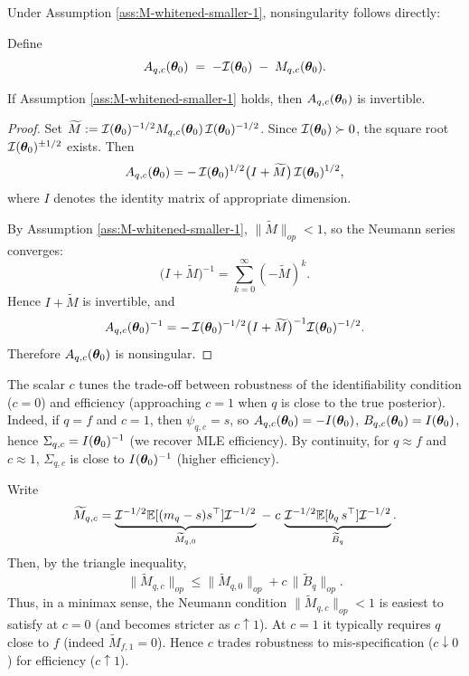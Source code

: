 \documentclass[twoside,11pt]{article}
\begin{document}
Under Assumption \eqref{ass:M-whitened-smaller-1}, nonsingularity follows directly:

\begin{lemma}
Define
\[
A_{q,c}({\bm{\theta}}_0)\;=\;-\mathcal I({{\bm{\theta}}_0}) \;-\; M_{q,c}({\bm{\theta}}_0).
\]

If Assumption \eqref{ass:M-whitened-smaller-1} holds, then $A_{q,c}({\bm{\theta}}_0)$ is invertible.
\end{lemma}

\begin{proof}
Set $\widetilde M := \mathcal I({{\bm{\theta}}_0})^{-1/2} M_{q,c}({\bm{\theta}}_0)\,\mathcal I({{\bm{\theta}}_0})^{-1/2}$. 
Since $\mathcal I({{\bm{\theta}}_0})\succ0$, the square root $\mathcal I({{\bm{\theta}}_0})^{\pm 1/2}$ exists. 
Then
\[
A_{q,c}({\bm{\theta}}_0)
= -\,\mathcal I({{\bm{\theta}}_0})^{1/2}\bigl(I+\widetilde M\bigr)\,\mathcal I({{\bm{\theta}}_0})^{1/2},
\]
where $I$ denotes the identity matrix of appropriate dimension.

By Assumption \eqref{ass:M-whitened-smaller-1}, $\|\widetilde M\|_{op}<1$, 
so the Neumann series converges:
\[
\bigl(I+\widetilde M\bigr)^{-1}=\sum_{k=0}^{\infty}(-\widetilde M)^k.
\]
Hence $I+\widetilde M$ is invertible, and
\[
A_{q,c}({\bm{\theta}}_0)^{-1}
= -\,\mathcal I({{\bm{\theta}}_0})^{-1/2}\bigl(I+\widetilde M\bigr)^{-1}\mathcal I({{\bm{\theta}}_0})^{-1/2}.
\]
Therefore $A_{q,c}({\bm{\theta}}_0)$ is nonsingular.
\end{proof}


\begin{corollary} The scalar $c$ tunes the trade-off between robustness of the identifiability condition ($c=0$) and efficiency (approaching $c=1$ when $q$ is close to the true posterior). 
Indeed, if $q=f$ and $c=1$, then $\psi_{q,c}=s$, so
$A_{q,c}({\bm{\theta}}_0)=-I({\bm{\theta}}_0)$, $B_{q,c}({\bm{\theta}}_0)=I({\bm{\theta}}_0)$, hence
$\Sigma_{q,c}=I({\bm{\theta}}_0)^{-1}$ (we recover MLE efficiency). By continuity, for $q\approx f$ and $c\approx1$,
$\Sigma_{q,c}$ is close to $I({\bm{\theta}}_0)^{-1}$ (higher efficiency).

\medskip
Write
\[
\widetilde M_{q,c}=\underbrace{\mathcal I^{-1/2}\mathbb{E}[(m_q-s)s^\top]\mathcal I^{-1/2}}_{\widetilde M_{q,0}}
\;-\;c\,\underbrace{\mathcal I^{-1/2}\mathbb{E}[b_q\,s^\top]\mathcal I^{-1/2}}_{\widetilde B_q}.
\]
Then, by the triangle inequality,
\[
\|\widetilde M_{q,c}\|_{op}\le \|\widetilde M_{q,0}\|_{op}+c\,\|\widetilde B_q\|_{op}.
\]
Thus, in a minimax sense, the Neumann condition $\|\widetilde M_{q,c}\|_{op}<1$ is easiest to satisfy at $c=0$
(and becomes stricter as $c\uparrow1$). At $c=1$ it typically requires $q$ close to $f$ (indeed
$\widetilde M_{f,1}=0$). Hence $c$ trades robustness to mis-specification ($c\!\downarrow\!0$) for efficiency ($c\!\uparrow\!1$).
\end{corollary}
\end{document}
